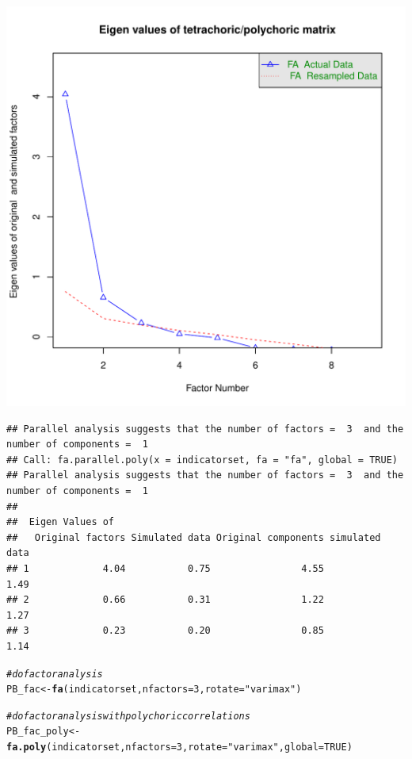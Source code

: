 \documentclass{article}\usepackage[]{graphicx}\usepackage[]{color}
\makeatletter
\def\maxwidth{ %
  \ifdim\Gin@nat@width>\linewidth
    \linewidth
  \else
    \Gin@nat@width
  \fi
}
\newcommand{\hlnum}[1]{\textcolor[rgb]{0.686,0.059,0.569}{#1}}%
\newcommand{\hlstr}[1]{\textcolor[rgb]{0.192,0.494,0.8}{#1}}%
\newcommand{\hlcom}[1]{\textcolor[rgb]{0.678,0.584,0.686}{\textit{#1}}}%
\newcommand{\hlstd}[1]{\textcolor[rgb]{0.345,0.345,0.345}{#1}}%
\newcommand{\hlkwb}[1]{\textcolor[rgb]{0.69,0.353,0.396}{#1}}%
\newcommand{\hlkwc}[1]{\textcolor[rgb]{0.333,0.667,0.333}{#1}}%
\newcommand{\hlkwd}[1]{\textcolor[rgb]{0.737,0.353,0.396}{\textbf{#1}}}%
\newenvironment{kframe}{%
 \def\at@end@of@kframe{}%
 \ifinner\ifhmode%
  \def\at@end@of@kframe{\end{minipage}}%
  \begin{minipage}{\columnwidth}%
 \fi\fi%
 \def\FrameCommand##1{\hskip\@totalleftmargin \hskip-\fboxsep
 \colorbox{shadecolor}{##1}\hskip-\fboxsep
     \hskip-\linewidth \hskip-\@totalleftmargin \hskip\columnwidth}%
 \MakeFramed {\advance\hsize-\width
   \@totalleftmargin\z@ \linewidth\hsize
   \@setminipage}}%
 {\par\unskip\endMakeFramed%
 \at@end@of@kframe}
\newenvironment{knitrout}{}{} %
\makeatother
\begin{document}
\begin{knitrout}
\includegraphics[width=\maxwidth]{figure/psych2} 
\begin{kframe}\begin{verbatim}
## Parallel analysis suggests that the number of factors =  3  and the number of components =  1
## Call: fa.parallel.poly(x = indicatorset, fa = "fa", global = TRUE)
## Parallel analysis suggests that the number of factors =  3  and the number of components =  1 
## 
##  Eigen Values of 
##   Original factors Simulated data Original components simulated data
## 1             4.04           0.75                4.55           1.49
## 2             0.66           0.31                1.22           1.27
## 3             0.23           0.20                0.85           1.14
\end{verbatim}
\begin{alltt}
\hlcom{#do factor analysis}
\hlstd{PB_fac} \hlkwb{<-} \hlkwd{fa}\hlstd{(indicatorset,} \hlkwc{nfactors}\hlstd{=}\hlnum{3}\hlstd{,} \hlkwc{rotate}\hlstd{=}\hlstr{"varimax"}\hlstd{)}

\hlcom{#do factor analysis with polychoric correlations}
\hlstd{PB_fac_poly} \hlkwb{<-} \hlkwd{fa.poly}\hlstd{(indicatorset,} \hlkwc{nfactors}\hlstd{=}\hlnum{3}\hlstd{,} \hlkwc{rotate}\hlstd{=}\hlstr{"varimax"}\hlstd{,}\hlkwc{global}\hlstd{=}\hlnum{TRUE}\hlstd{)}


\end{alltt}
\end{kframe}
\end{knitrout}
\end{document}
